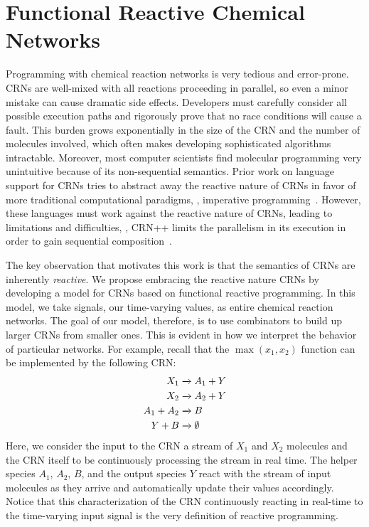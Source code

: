 \section{Functional Reactive Chemical Networks}
\label{sec:proposed_work}
Programming with chemical reaction networks is very tedious and error-prone.
CRNs are well-mixed with all reactions proceeding in parallel, so even a minor mistake can cause dramatic side effects.
Developers must carefully consider all possible execution paths and rigorously prove that no race conditions will cause a fault.
This burden grows exponentially in the size of the CRN and the number of molecules involved, which often makes developing sophisticated algorithms intractable.
Moreover, most computer scientists find molecular programming very unintuitive because of its non-sequential semantics.
Prior work on language support for CRNs tries to abstract away the reactive nature of CRNs in favor of more traditional computational paradigms, \eg, imperative programming~\cite{khurshid2018}.
However, these languages must work against the reactive nature of CRNs, leading to limitations and difficulties, \eg, CRN++ limits the parallelism in its execution in order to gain sequential composition~\cite{khurshid2018}.

The key observation that motivates this work is that the semantics of CRNs are inherently \emph{reactive}.
We propose embracing the reactive nature CRNs by developing a model for CRNs based on functional reactive programming.
In this model, we take signals, our time-varying values, as entire chemical reaction networks.
The goal of our model, therefore, is to use combinators to build up larger CRNs from smaller ones.
This is evident in how we interpret the behavior of particular networks.
For example, recall that the \( \max(x_1, x_2) \) function can be implemented by the following CRN:
\begin{align*}
    X_1 &\xrightarrow{} A_1 + Y\\
    X_2 &\xrightarrow{} A_2 + Y\\
    A_1 + A_2 &\xrightarrow{} B\\
    Y + B &\xrightarrow{} \emptyset
\end{align*}
Here, we consider the input to the CRN a stream of \( X_1 \) and \( X_2 \) molecules and the CRN itself to be continuously processing the stream in real time.
The helper species \( A_1 \), \( A_2 \), \( B \), and the output species \( Y \) react with the stream of input molecules as they arrive and automatically update their values accordingly.
Notice that this characterization of the CRN continuously reacting in real-time to the time-varying input signal is the very definition of reactive programming.


